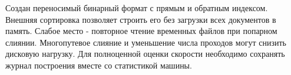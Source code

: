 \conclusions
Создан переносимый бинарный формат с прямым и обратным индексом.
Внешняя сортировка позволяет строить его без загрузки всех документов
в память. Слабое место - повторное чтение временных файлов при
попарном слиянии. Многопутевое слияние и уменьшение числа проходов
могут снизить дисковую нагрузку. Для полноценной оценки скорости
необходимо сохранять журнал построения вместе со статистикой машины.
